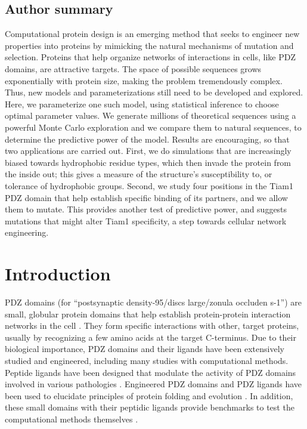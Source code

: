 \documentclass[12pt]{article}
\begin{document}
\subsection*{Author summary}
Computational protein design is an emerging method that seeks to engineer new properties into proteins by mimicking the
natural mechanisms of mutation and selection. Proteins that help organize networks of interactions in cells, like PDZ
domains, are attractive targets. The space of possible sequences grows exponentially with protein size, making the problem
tremendously complex. Thus, new models and parameterizations still need to be developed and explored. Here, we parameterize
one such model, using statistical inference to choose optimal parameter values. We generate millions of theoretical sequences
using a powerful Monte Carlo exploration and we compare them to natural sequences, to determine the predictive power of the
model. Results are encouraging, so that two applications are carried out. First, we do simulations that are increasingly biased
towards hydrophobic residue types, which then invade the protein from the inside out; this gives a measure of the structure's
susceptibility to, or tolerance of hydrophobic groups. Second, we study four positions in the Tiam1 PDZ domain that help establish
specific binding of its partners, and we allow them to mutate. This provides another test of predictive power, and suggests
mutations that might alter Tiam1 specificity, a step towards cellular network engineering.

\parindent 8mm

\pagebreak

\section{Introduction}
PDZ domains (for ``postsynaptic density-95/discs large/zonula occluden s-1'') are small, globular protein domains that help establish
protein-protein interaction networks in the cell \cite{Harris01,Hung02,Tonikian08,Gfeller11,Subbaiah11,Sheperd11r}. They form specific
interactions with other, target proteins, usually by recognizing a few amino acids at the target C-terminus. Due to their biological
importance, PDZ domains and their ligands have been extensively studied and engineered, including many studies with computational
methods. Peptide ligands have been designed that modulate the activity of PDZ domains involved in various pathologies \cite{Bach12,
Roberts12,Zheng15}. Engineered PDZ domains and PDZ ligands have been used to elucidate principles of protein folding and evolution
\cite{Socolich05,Kong09,Mclaughlin12,Melero14}. In addition, these small domains with their peptidic ligands provide benchmarks
to test the computational methods themselves \cite{Reina02,Schmidt10,Smith10}.
\end{document}
